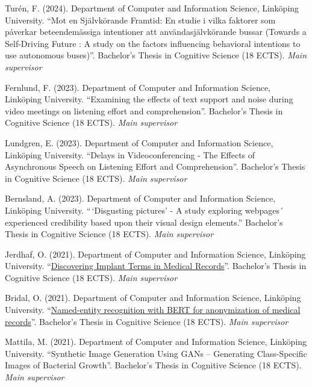\documentclass[]{article}
\begin{document}
Turén, F. (2024). Department of Computer and Information Science,
Linköping University. ``Mot en Självkörande Framtid: En studie i vilka
faktorer som påverkar beteendemässiga intentioner att
användasjälvkörande bussar (Towards a Self-Driving Future : A study on
the factors influencing behavioral intentions to use autonomous
buses)''. Bachelor's Thesis in Cognitive Science (18 ECTS). \emph{Main
supervisor}

Fernlund, F. (2023). Department of Computer and Information Science,
Linköping University. ``Examining the effects of text support and noise
during video meetings on listening effort and comprehension''.
Bachelor's Thesis in Cognitive Science (18 ECTS). \emph{Main supervisor}

Lundgren, E. (2023). Department of Computer and Information Science,
Linköping University. ``Delays in Videoconferencing - The Effects of
Asynchronous Speech on Listening Effort and Comprehension''. Bachelor's
Thesis in Cognitive Science (18 ECTS). \emph{Main supervisor}

Bernsland, A. (2023). Department of Computer and Information Science,
Linköping University. ``\,`Disgusting pictures' - A study exploring
webpages´ experienced credibility based upon their visual design
elements.'' Bachelor's Thesis in Cognitive Science (18 ECTS). \emph{Main
supervisor}

Jerdhaf, O. (2021). Department of Computer and Information Science,
Linköping University.
``\href{http://liu.diva-portal.org/smash/record.jsf?dswid=-6296&pid=diva2\%3A1621364&c=1&searchType=SIMPLE&language=sv&query=Jerdhaf&af=\%5B\%5D&aq=\%5B\%5B\%5D\%5D&aq2=\%5B\%5B\%5D\%5D&aqe=\%5B\%5D&noOfRows=50&sortOrder=author_sort_asc&sortOrder2=title_sort_asc&onlyFullText=false&sf=undergraduate}{Discovering
Implant Terms in Medical Records}''. Bachelor's Thesis in Cognitive
Science (18 ECTS). \emph{Main supervisor}

Bridal, O. (2021). Department of Computer and Information Science,
Linköping University.
``\href{http://liu.diva-portal.org/smash/record.jsf?dswid=-6296&faces-redirect=true&language=en&searchType=SIMPLE&query=Marsja&af=\%5B\%5D&aq=\%5B\%5B\%5D\%5D&aq2=\%5B\%5B\%5D\%5D&aqe=\%5B\%5D&pid=diva2\%3A1566701&noOfRows=50&sortOrder=author_sort_asc&sortOrder2=title_sort_asc&onlyFullText=false&sf=undergraduate}{Named-entity
recognition with BERT for anonymization of medical records}''.
Bachelor's Thesis in Cognitive Science (18 ECTS). \emph{Main supervisor}

Mattila, M. (2021). Department of Computer and Information Science,
Linköping University. ``Synthetic Image Generation Using GANs --
Generating Class-Specific Images of Bacterial Growth''. Bachelor's
Thesis in Cognitive Science (18 ECTS). \emph{Main supervisor}
\end{document}
